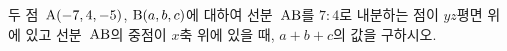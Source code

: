 두 점~$\mathrm{A}(-7{,}\mkern3mu\mathopen{}4{,}\mkern3mu\mathopen{}-5)$, $\mathrm{B}(a{,}\mkern3mu\mathopen{}b{,}\mkern3mu\mathopen{}c)$에 대하여 선분~$\mathrm{AB}$를 $7:4$로 내분하는 점이 $yz$평면 위에 있고 선분~$\mathrm{AB}$의 중점이 $x$축 위에 있을 때, $a+b+c$의 값을 구하시오.
